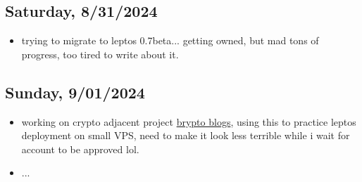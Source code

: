 \subsection*{Saturday, 8/31/2024}
\begin{itemize}
    \item trying to migrate to leptos 0.7beta... getting owned, but mad tons of
        progress, too tired to write about it.
\end{itemize}

\subsection{Sunday, 9/01/2024}
\begin{itemize}
    \item working on crypto adjacent project
        \textcolor{blue}{\href{https://bryptoblogs.xyz}{brypto blogs}}, using this to
        practice leptos deployment on small VPS, need to make it look less
        terrible while i wait for account to be approved lol.
    \item ...
\end{itemize}
